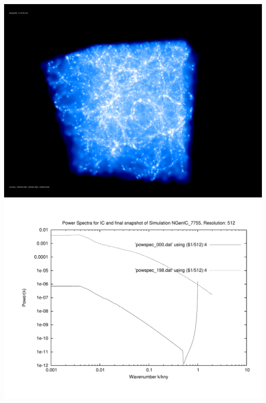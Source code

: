 \includegraphics[scale=0.2]{r512/NGenIC_7755/screenshot.png} \\
\includegraphics[scale=0.5]{r512/NGenIC_7755/plot_powspec_NGenIC_7755.pdf}

% 
%
%
%
%
%
%
%

\newpage
